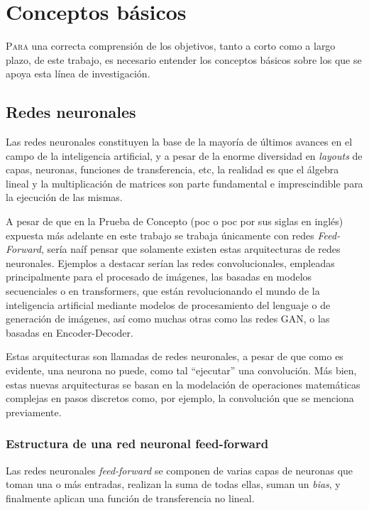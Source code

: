 \chapter{Conceptos básicos}
\label{chap:conceptos_basicos}

\lettrine{P}{ara} una correcta comprensión de los objetivos, tanto a corto como a largo plazo, de este trabajo, es necesario entender los conceptos básicos sobre los que se apoya esta línea de investigación.

\section{Redes neuronales}
\label{sec:redes_neuronales}
Las redes neuronales constituyen la base de la mayoría de últimos avances en el campo de la inteligencia artificial, y a pesar de la enorme diversidad en \textit{layouts} de capas, neuronas, funciones de transferencia, etc, la realidad es que el álgebra lineal y la multiplicación de matrices son parte fundamental e imprescindible para la ejecución de las mismas. \cite[Figure 3.4]{deep_learning_for_computer_architects}

A pesar de que en la Prueba de Concepto (\acrlong{poc} o \acrshort{poc} por sus siglas en inglés) expuesta más adelante en este trabajo se trabaja únicamente con redes \textit{Feed-Forward}, sería naíf pensar que solamente existen estas arquitecturas de redes neuronales. Ejemplos a destacar serían las redes convolucionales, empleadas principalmente para el procesado de imágenes, las basadas en modelos secuenciales o en transformers, que están revolucionando el mundo de la inteligencia artificial mediante modelos de procesamiento del lenguaje o de generación de imágenes, así como muchas otras como las redes GAN, o las basadas en Encoder-Decoder.

Estas arquitecturas son llamadas de redes neuronales, a pesar de que como es evidente, una neurona no puede, como tal ``ejecutar'' una convolución. Más bien, estas nuevas arquitecturas se basan en la modelación de operaciones matemáticas complejas en pasos discretos como, por ejemplo, la convolución que se menciona previamente.

\subsection{Estructura de una red neuronal feed-forward}
\label{ssec:estructura_red_neuronal_ff}
Las redes neuronales \textit{feed-forward} se componen de varias capas de neuronas que toman una o más entradas, realizan la suma de todas ellas, suman un \textit{bias}, y finalmente aplican una función de transferencia no lineal.

